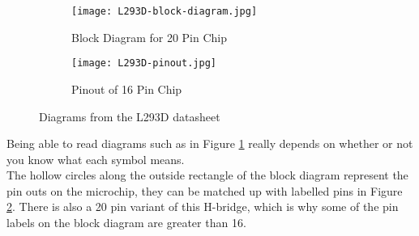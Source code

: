 \documentclass[../TinyBot.tex]{subfiles}
\begin{document}
        

\begin{figure}[h]
    \centering

    \begin{subfigure}[t]{0.5\textwidth}
        \texttt{[image: L293D-block-diagram.jpg]}
        \caption{Block Diagram for 20 Pin Chip}
        \label{fig:l293d-block-diagram}
    \end{subfigure}
    \begin{subfigure}[t]{0.3\textwidth}
        \centering
        \texttt{[image: L293D-pinout.jpg]}
        \caption{Pinout of 16 Pin Chip}
        \label{fig:l293d-pinout}
    \end{subfigure}

    \caption{Diagrams from the L293D datasheet}
    \label{fig:l293d}
\end{figure}


\FloatBarrier


Being able to read diagrams such as in Figure \ref{fig:l293d-block-diagram} really depends on whether or not you know what each symbol means. \\


The hollow circles along the outside rectangle of the block diagram represent the pin outs on the microchip, they can be matched up with labelled pins in Figure \ref{fig:l293d-pinout}. There is also a 20 pin variant of this H-bridge, which is why some of the pin labels on the block diagram are greater than 16.\\
\end{document}
